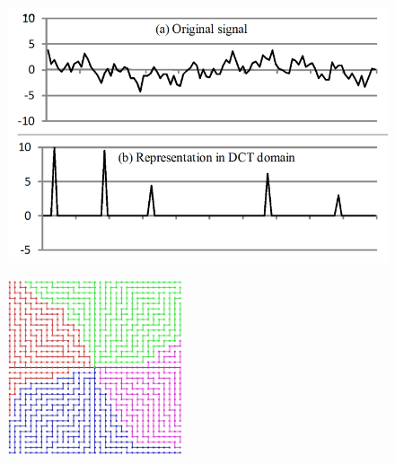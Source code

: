 \begin{figure}
\centering
\begin{minipage}{.5\textwidth}
  \centering
  \includegraphics[width=\linewidth]{images/example-signal-sparse.png}
  \label{fig:sparsesignal}
\end{minipage}%
\begin{minipage}{.5\textwidth}
  \centering
  \includegraphics[width=\linewidth, height=5.2cm]{images/grid-topology-luo.png}
  \label{fig:grid topology}
\end{minipage}
\end{figure}

